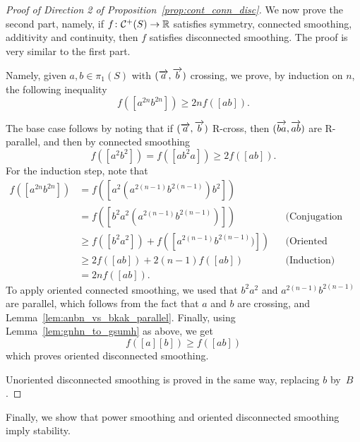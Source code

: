 \begin{proof}[Proof of Direction 2 of Proposition~\ref{prop:cont_conn_disc}]
		
		We now prove the second part, namely, if $f \colon \mathcal{C}^+(S) \to \mathbb{R}$ satisfies symmetry, connected smoothing, additivity and continuity, then $f$ satisfies disconnected smoothing. The proof is very similar to the first part.
			
			 Namely, given $a, b \in \pi_1(S)$ with $(\overrightarrow{a},\overrightarrow{b})$ crossing, we prove, by induction on $n$, the following inequality
			\begin{equation}
				f([a^{2n}b^{2n}]) \geq 2nf([ab]).
				\label{eq:inequality_smoothing}
			\end{equation}
			
			The base case follows by noting that if $(\overrightarrow{a},\overrightarrow{b})$ R-cross, then $(\overrightarrow{ba},\overrightarrow{ab})$ are R-parallel, and then by connected smoothing
			\[
			f([a^2b^2])=f([ab^2a]) \geq 2f([ab]).
			\]
			For the induction step, note that
			\begin{align*}
				f([a^{2n}b^{2n}]) &= f([a^2(a^{2(n-1)}b^{2(n-1)})b^2])\\
				&= f([b^2a^2(a^{2(n-1)}b^{2(n-1)})])&& \text{(Conjugation invariance)} \\
				&\geq f([b^2a^2]) + f([a^{2(n-1)}b^{2(n-1)})]) && \text{(Oriented connected smoothing)} \\
				&\geq 2f([ab]) + 2(n-1)f([ab]) && \text{(Induction)} \\
                &= 2nf([ab]).
			\end{align*}
			To apply oriented connected smoothing, we used that $b^2a^2$ and $a^{2(n-1)}b^{2(n-1)}$ are parallel, which follows from the fact that $a$ and $b$ are crossing, and Lemma~\ref{lem:anbn_vs_bkak_parallel}. 
			Finally, using Lemma~\ref{lem:gnhn_to_gsumh} as above, we get
			\[
			f([a] [b]) \geq f([ab])
			\]
			which proves oriented disconnected smoothing.
	
			Unoriented disconnected smoothing is proved in the same way, replacing
			$b$ by~$B$.
\end{proof}

Finally, we show that power smoothing and oriented disconnected smoothing imply stability.

